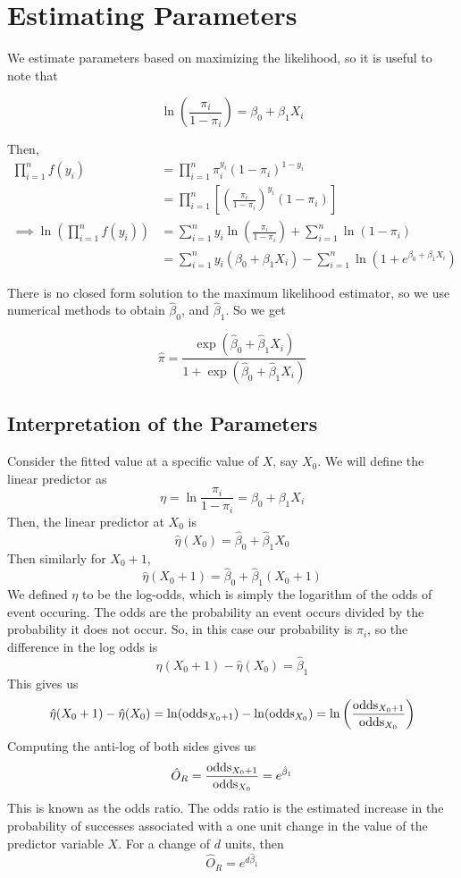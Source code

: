 \section{Estimating Parameters}

We estimate parameters based on maximizing the likelihood, so it is useful to note that 

\[\ln \left(\frac{\pi_i}{1-\pi_i}\right) = \beta_0 + \beta_1X_i\]

Then,
\begin{align*}
    \prod_{i=1}^n f(y_i) &= \prod_{i=1}^n \pi_i^{y_i}(1-\pi_i)^{1-y_i}\\    
    &= \prod_{i=1}^n \left[\left(\frac{\pi_i}{1-\pi_i}\right)^{y_i}(1-\pi_i)\right]\\
    \implies \ln \left(\prod_{i=1}^n f(y_i)\right)&= \sum_{i=1}^n y_i \ln \left(\frac{\pi_i}{1-\pi_i}\right) + \sum_{i=1}^n \ln(1-\pi_i)\\
    &= \sum_{i=1}^n y_i(\beta_0 + \beta_1X_i) - \sum_{i=1}^n \ln(1+e^{\beta_0 + \beta_1X_i})
\end{align*}

There is no closed form solution to the maximum likelihood estimator, so we use numerical methods to obtain $\hat{\beta}_0$, and $\hat{\beta}_1$. So we get 

\[\hat{\pi} = \frac{\exp(\hat{\beta}_0 + \hat{\beta}_1X_i)}{1 + \exp(\hat{\beta}_0 + \hat{\beta}_1X_i)}\]


\subsection{Interpretation of the Parameters}

Consider the fitted value at a specific value of $X$, say $X_0$. We will define the linear predictor as
\[\eta = \ln \frac{\pi_i}{1 - \pi_i} = \beta_0 + \beta_1 X_i\]
Then, the linear predictor at $X_0$ is 
\[\hat{\eta}(X_0) = \hat{\beta}_0 + \hat{\beta}_1X_0\]
Then similarly for $X_0 + 1$,
\[\hat{\eta}(X_0 + 1) = \hat{\beta}_0 + \hat{\beta}_1(X_0 + 1)\]
We defined $\eta$ to be the log-odds, which is simply the logarithm of the odds of event occuring. The odds are the probability an event occurs divided by the probability it does not occur. So, in this case our probability is $\pi_i$, so the difference in the log odds is 
\[\hat{\eta}(X_0 + 1) - \hat{\eta}(X_0) = \hat{\beta}_1\]
This gives us 
\[\hat{\eta}(X_0 + 1) - \hat{\eta}(X_0) = \ln(\operatorname{odds}_{X_0 + 1}) - \ln(\operatorname{odds}_{X_0}) = \ln\left(\frac{\operatorname{odds}_{X_0+1}}{\operatorname{odds}_{X_0}}\right)\]
Computing the anti-log of both sides gives us
\[\hat{O}_R = \frac{\operatorname{odds}_{X_0 + 1}}{\operatorname{odds}_{X_0}} = e^{\hat{\beta}_1}\]
This is known as the odds ratio. The odds ratio is the estimated increase in the probability of successes associated with a one unit change in the value of the predictor variable $X$. For a change of $d$ units, then 
\[\hat{O}_R = e^{d\hat{\beta}_1}\]


